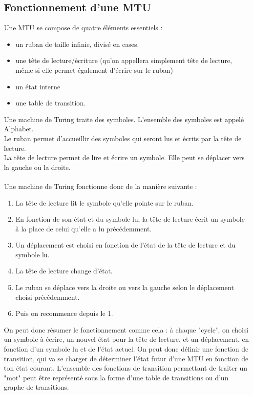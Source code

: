 \documentclass[12pt]{article}
\begin{document}
	\subsection{Fonctionnement d'une MTU}
	Une MTU se compose de quatre éléments essentiels :
	\begin{itemize}[label=$-$]
		\item un ruban de taille infinie, divisé en cases.\\
		\item une tête de lecture/écriture (qu'on appellera simplement tête de lecture, même si elle permet également d'écrire sur le ruban)\\
		\item un état interne
		\item une table de transition.
	\end{itemize}
	Une machine de Turing traite des symboles. L'ensemble des symboles est appelé Alphabet.\\
	Le ruban permet d'accueillir des symboles qui seront lus et écrits par la tête de lecture.\\
	La tête de lecture permet de lire et écrire un symbole. Elle peut se déplacer vers la gauche ou la droite.\\
	\\
	Une machine de Turing fonctionne donc de la manière suivante :\\
	\begin{enumerate}
		\item La tête de lecture lit le symbole qu'elle pointe sur le ruban.\\
		\item En fonction de son état et du symbole lu, la tête de lecture écrit un symbole à la place de celui qu'elle a lu précédemment.\\
		\item Un déplacement est  choisi en fonction de l'état de la tête de lecture et du symbole lu.\\
		\item La tête de lecture change d'état.\\
		\item Le ruban se déplace vers la droite ou vers la gauche selon le déplacement choisi précédemment.\\
		\item Puis on recommence depuis le 1.\\
	\end{enumerate}
	 On peut donc résumer le fonctionnement comme cela : à chaque "cycle", on choisi un symbole à écrire, un nouvel état pour la tête de lecture, et un déplacement, en fonction d'un symbole lu et de l'état actuel. On peut donc définir une fonction de transition, qui va se charger de déterminer l'état futur d'une MTU en fonction de ton état courant. L'ensemble des fonctions de transition permettant de traiter un "mot" peut être représenté sous la forme d'une table de transitions ou d'un graphe de transitions.\\
\end{document}
